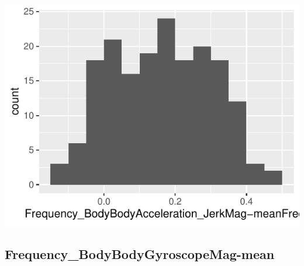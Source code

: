 \documentclass[
]{article}
\begin{document}
\begin{minipage}{0.25 \textwidth}

\includegraphics{codebook_tidydatasub_files/figure-latex/Var-75-Frequency-BodyBodyAcceleration-JerkMag-meanFreq--1.pdf}

\end{minipage}

\noindent\makebox[\linewidth]{\rule{\textwidth}{0.4pt}}

\hypertarget{frequency_bodybodygyroscopemag-mean}{%
\subsection{Frequency\_BodyBodyGyroscopeMag-mean}\label{frequency_bodybodygyroscopemag-mean}}
\end{document}

